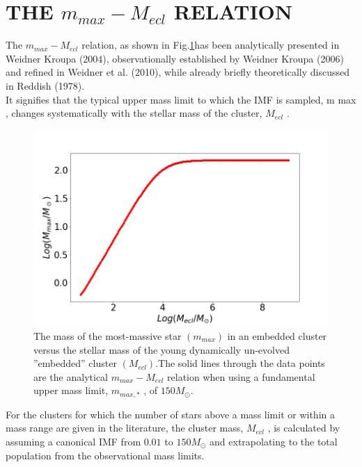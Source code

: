 \section{THE $m_{max}-M_{ecl}$ RELATION}
The $m_{max}-M_{ecl}$ relation, as shown in Fig.\ref{fig:max-mecl}has been analytically presented in Weidner  Kroupa (2004), observationally
established by Weidner  Kroupa (2006) and refined in Weidner et al. (2010), while already briefly theoretically discussed
in Reddish (1978).\\
It signifies that the typical upper mass limit to which the IMF is sampled, m max , changes systematically
with the stellar mass of the cluster, $M_{ecl}$ .
\begin{figure}[h]\centering
	\includegraphics[width=0.7\linewidth]{max-melc.png}
	\caption{The mass of the most-massive star $(m_{max})$ in an embedded cluster versus the stellar mass of the young dynamically
		un-evolved ”embedded” cluster $(M_{ecl})$.The solid lines through the data points are the analytical $m_{max}-M_{ecl}$
		relation when using a fundamental upper mass limit, $m_{max,*}$ , of $150 M_{\odot}$.}
	\label{fig:max-mecl}
\end{figure}
For the clusters for which the number of stars above a mass limit or within a mass range are given in the literature,
the cluster mass,  $M_{ecl}$  , is calculated by assuming a canonical IMF from $0.01$ to $150 M_{\odot}$ and extrapolating
to the total population from the observational mass limits.
